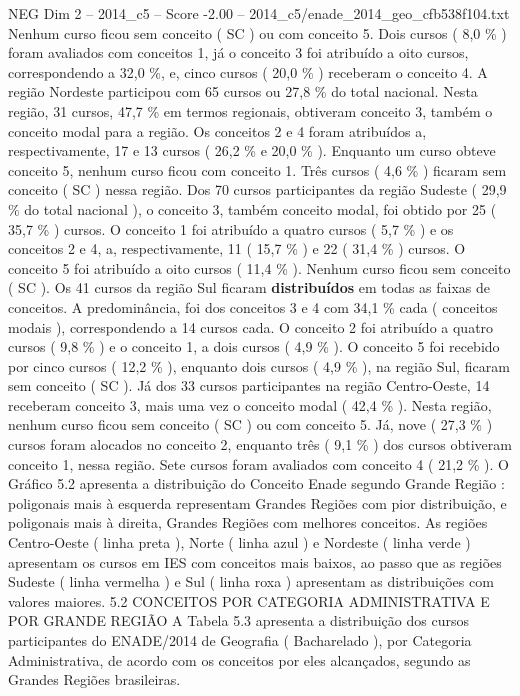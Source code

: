 \begin{textsample}{NEG Dim 2 – 2014\_c5 – Score -2.00 – 2014\_c5/enade\_2014\_geo\_cfb538f104.txt}
Nenhum curso ficou sem conceito ( SC ) ou com conceito 5.
Dois cursos ( 8,0 \% ) foram avaliados com conceitos 1, já o conceito 3 foi atribuído a oito cursos, correspondendo a 32,0 \%, e, cinco cursos ( 20,0 \% ) receberam o conceito 4.
A região Nordeste participou com 65 cursos ou 27,8 \% do total nacional.
Nesta região, 31 cursos, 47,7 \% em termos regionais, obtiveram conceito 3, também o conceito modal para a região.
Os conceitos 2 e 4 foram atribuídos a, respectivamente, 17 e 13 cursos ( 26,2 \% e 20,0 \% ).
Enquanto um curso obteve conceito 5, nenhum curso ficou com conceito 1.
Três cursos ( 4,6 \% ) ficaram sem conceito ( SC ) nessa região.
Dos 70 cursos participantes da região Sudeste ( 29,9 \% do total nacional ), o conceito 3, também conceito modal, foi obtido por 25 ( 35,7 \% ) cursos.
O conceito 1 foi atribuído a quatro cursos ( 5,7 \% ) e os conceitos 2 e 4, a, respectivamente, 11 ( 15,7 \% ) e 22 ( 31,4 \% ) cursos.
O conceito 5 foi atribuído a oito cursos ( 11,4 \% ).
Nenhum curso ficou sem conceito ( SC ).
Os 41 cursos da região Sul ficaram \textbf{distribuídos} em todas as faixas de conceitos.
A predominância, foi dos conceitos 3 e 4 com 34,1 \% cada ( conceitos modais ), correspondendo a 14 cursos cada.
O conceito 2 foi atribuído a quatro cursos ( 9,8 \% ) e o conceito 1, a dois cursos ( 4,9 \% ).
O conceito 5 foi recebido por cinco cursos ( 12,2 \% ), enquanto dois cursos ( 4,9 \% ), na região Sul, ficaram sem conceito ( SC ).
Já dos 33 cursos participantes na região Centro-Oeste, 14 receberam conceito 3, mais uma vez o conceito modal ( 42,4 \% ).
Nesta região, nenhum curso ficou sem conceito ( SC ) ou com conceito 5.
Já, nove ( 27,3 \% ) cursos foram alocados no conceito 2, enquanto três ( 9,1 \% ) dos cursos obtiveram conceito 1, nessa região.
Sete cursos foram avaliados com conceito 4 ( 21,2 \% ).
O Gráfico 5.2 apresenta a distribuição do Conceito Enade segundo Grande Região : poligonais mais à esquerda representam Grandes Regiões com pior distribuição, e poligonais mais à direita, Grandes Regiões com melhores conceitos.
As regiões Centro-Oeste ( linha preta ), Norte ( linha azul ) e Nordeste ( linha verde ) apresentam os cursos em IES com conceitos mais baixos, ao passo que as regiões Sudeste ( linha vermelha ) e Sul ( linha roxa ) apresentam as distribuições com valores maiores. 5.2 CONCEITOS POR CATEGORIA ADMINISTRATIVA E POR GRANDE REGIÃO A Tabela 5.3 apresenta a distribuição dos cursos participantes do ENADE/2014 de Geografia ( Bacharelado ), por Categoria Administrativa, de acordo com os conceitos por eles alcançados, segundo as Grandes Regiões brasileiras.

\end{textsample}

